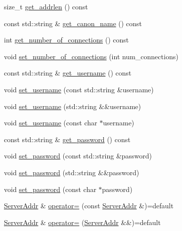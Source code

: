 \begin{DoxyCompactItemize}
\item 
size\+\_\+t \hyperlink{class_nntp_client_1_1_server_addr_ac0737342c3b56311c50e1bf420d82904}{get\+\_\+addrlen} () const
\item 
const std\+::string \& \hyperlink{class_nntp_client_1_1_server_addr_a8b75975f3d475115e4a2c08d325871b4}{get\+\_\+canon\+\_\+name} () const
\item 
int \hyperlink{class_nntp_client_1_1_server_addr_a1d1cc29ce2f8c2a0e610bd4836c07f84}{get\+\_\+number\+\_\+of\+\_\+connections} () const
\item 
void \hyperlink{class_nntp_client_1_1_server_addr_acdf2a374db8aaa62703037cfd7d60e3a}{set\+\_\+number\+\_\+of\+\_\+connections} (int num\+\_\+connections)
\item 
const std\+::string \& \hyperlink{class_nntp_client_1_1_server_addr_a17dd214bd1236635549fa371535d9374}{get\+\_\+username} () const
\item 
void \hyperlink{class_nntp_client_1_1_server_addr_af0306b61dc76b461403da778665f611c}{set\+\_\+username} (const std\+::string \&username)
\item 
void \hyperlink{class_nntp_client_1_1_server_addr_a8e832fe4605e3bf540169e8725837842}{set\+\_\+username} (std\+::string \&\&username)
\item 
void \hyperlink{class_nntp_client_1_1_server_addr_a5ba86685fe0cced320a0c785d59d72b6}{set\+\_\+username} (const char $\ast$username)
\item 
const std\+::string \& \hyperlink{class_nntp_client_1_1_server_addr_a675d9c66531b33bdb92e639befc30440}{get\+\_\+password} () const
\item 
void \hyperlink{class_nntp_client_1_1_server_addr_a95a3912a9c287c3dbb06ca4476dac993}{set\+\_\+password} (const std\+::string \&password)
\item 
void \hyperlink{class_nntp_client_1_1_server_addr_a8abc70e426256440b6188d89b7b65db7}{set\+\_\+password} (std\+::string \&\&password)
\item 
void \hyperlink{class_nntp_client_1_1_server_addr_a89d3bec4ac2e5ed0e9acdcf07de34fd6}{set\+\_\+password} (const char $\ast$password)
\item 
\hyperlink{class_nntp_client_1_1_server_addr}{Server\+Addr} \& \hyperlink{class_nntp_client_1_1_server_addr_aa6be5e421585f72c84f4ee0daff39319}{operator=} (const \hyperlink{class_nntp_client_1_1_server_addr}{Server\+Addr} \&)=default
\item 
\hyperlink{class_nntp_client_1_1_server_addr}{Server\+Addr} \& \hyperlink{class_nntp_client_1_1_server_addr_aaba670b1aa1ae58c2ed75334903c9cb2}{operator=} (\hyperlink{class_nntp_client_1_1_server_addr}{Server\+Addr} \&\&)=default
\end{DoxyCompactItemize}


